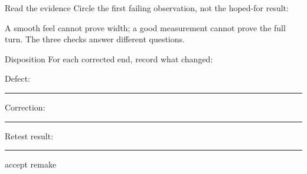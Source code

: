 \smallskip
\noindent
\begin{minipage}[t]{0.48\linewidth}
\begin{telospanel}{Read the evidence}
Circle the first failing observation, not the hoped-for result:
\begin{center}
\end{center}
A smooth feel cannot prove width; a good measurement cannot prove the full
turn. The three checks answer different questions.
\end{telospanel}
\end{minipage}\hfill
\begin{minipage}[t]{0.48\linewidth}
\begin{telospanel}{Disposition}
For each corrected end, record what changed:
\vspace{0.35em}

\noindent Defect: \rule{4.6cm}{.3pt}

\vspace{0.35em}
\noindent Correction: \rule{4.25cm}{.3pt}

\vspace{0.35em}
\noindent Retest result: \rule{4.15cm}{.3pt}

\vspace{0.35em}
\noindent\fbox{\rule{0pt}{.8ex}\rule{.8ex}{0pt}} accept\qquad
\fbox{\rule{0pt}{.8ex}\rule{.8ex}{0pt}} remake
\end{telospanel}
\end{minipage}

\normalsize

